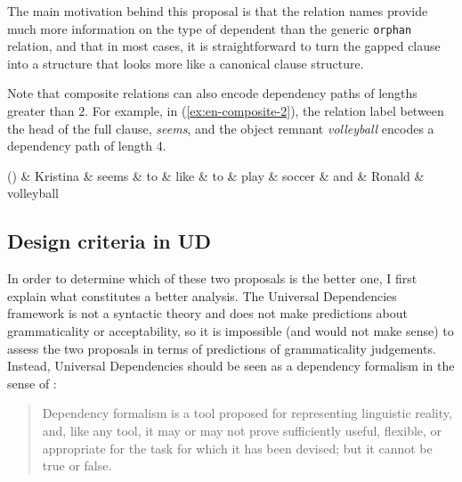 \documentclass[lucida,biblatex]{sp} %
\newcounter{excounter}
\begin{document}
The main motivation behind this proposal is that the relation names provide much more information on the type of dependent than the generic \texttt{orphan} relation, and that in most cases, it is straightforward to turn the gapped clause into a structure that looks more like a canonical clause structure. 

Note that composite relations can also encode dependency paths of lengths greater than 2. For example, in (\ref{ex:en-composite-2}), the relation label between the head of the full clause, {\it seems}, and the object remnant {\it volleyball} encodes a dependency path of length 4.

\begin{center}
\label{ex:en-composite-2}
\footnotesize
  \begin{dependency}[edge unit distance=2.5ex]
    \begin{deptext}[column sep=0.3cm]
      (\theexcounter) \& Kristina \& seems \& to \& like \& to \& play \& soccer \& and \& Ronald \& volleyball\\
    \end{deptext}
  \end{dependency}
\end{center}


\subsection{Design criteria in UD}

In order to determine which of these two proposals is the better one, I first explain what constitutes a better analysis. The Universal Dependencies framework is not a syntactic theory and does not make predictions about grammaticality or acceptability, so it is impossible (and would not make sense) to assess the two proposals in terms of predictions of grammaticality judgements. Instead, Universal Dependencies should be seen as a dependency formalism in the sense of \citet{Melcuk1988}:

\begin{quote}
Dependency formalism is a tool proposed for representing linguistic reality, and, like any tool, it may or may not prove sufficiently useful, flexible, or appropriate for the task for which it has been devised; but it cannot be true or false. \\
\null \hfill  \citep[p. 12]{Melcuk1988}
\end{quote}  
\end{document}
